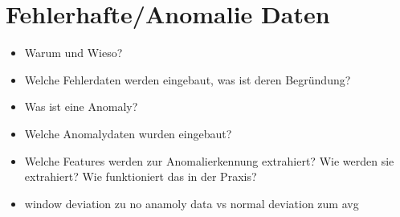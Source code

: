 \section{Fehlerhafte/Anomalie Daten}
\label{sec:data_anomalie}
\begin{itemize}
    \item Warum und Wieso?
    \item Welche Fehlerdaten werden eingebaut, was ist deren Begründung?
    \item Was ist eine Anomaly?
    \item Welche Anomalydaten wurden eingebaut?
    \item Welche Features werden zur Anomalierkennung extrahiert? Wie werden sie extrahiert? Wie funktioniert das in der Praxis?
    \item window deviation zu no anamoly data vs normal deviation zum avg
\end{itemize}